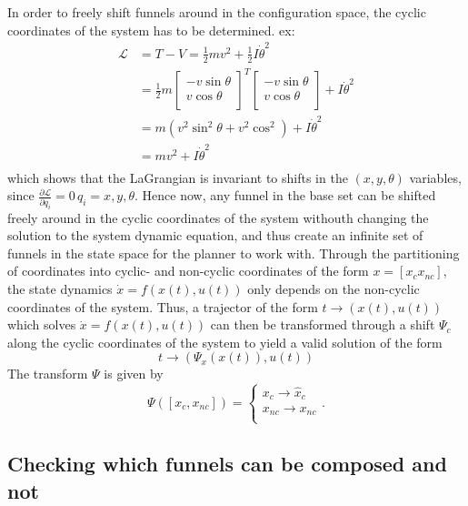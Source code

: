 In order to freely shift funnels around in the configuration space, the cyclic
coordinates of the system has to be determined. ex:
\begin{align}
  \mathcal{L} &= T - V = \frac{1}{2} mv^2 + \frac{1}{2}I\dot{\theta}^2 \\ 
              &= \frac{1}{2} 
                m\begin{bmatrix}
                  -v\sin \theta \\ 
                  v \cos \theta \\
                \end{bmatrix}^{T}
  \begin{bmatrix}
    -v\sin \theta \\
    v \cos \theta \\
  \end{bmatrix}
  + I\dot{\theta}^2 \\
              &= m \left(
                v^2 \sin^2 \theta + v^2 \cos^2
                \right)  + I {\dot{\theta}}^2 \\
              &= mv^2 + I {\dot{\theta}}^2 \\
\end{align}
which shows that the LaGrangian is invariant to shifts in the \((x,y,\theta)\)
variables, since \(\frac{\partial\mathcal{L}}{\partial q_i} = 0 \, q_i =
x,y,\theta\). Hence now, any funnel in the base set can be shifted freely around
in the cyclic coordinates of the system withouth changing the solution to the
system dynamic equation, and thus create an infinite set of funnels in the state
space for the planner to work with. Through the partitioning of coordinates into
cyclic- and non-cyclic coordinates of the form \(x = [x_c x_{nc}]\), the state
dynamics \(\dot{x} = f(x(t), u(t))\) only depends on the non-cyclic coordinates
of the system. Thus, a trajector of the form \(t \rightarrow (x(t),u(t))\) which
solves \(\dot{x} = f(x(t),u(t))\) can then be transformed through a shift
\(\Psi_c\) along the cyclic coordinates of the system to yield a valid solution
of the form
\[
  t \rightarrow (\Psi_{x}(x(t)), u(t))
\]
The transform \(\Psi\) is given by
\[
  \Psi([x_c, x_{nc}]) =  
  \begin{cases}
    x_c \rightarrow \hat{x}_{c} \\
    x_{nc} \rightarrow x_{nc} \\
  \end{cases}.
\]

\subsection{Checking which funnels can be composed and not}
\label{sec:composable-funnels}

